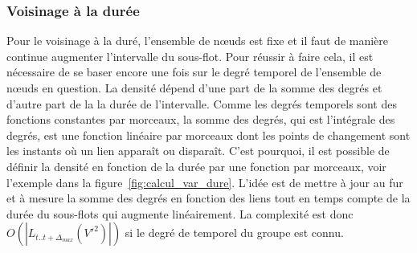 \subsubsection{Voisinage à la durée}
Pour le voisinage à la duré, l'ensemble de n\oe uds est fixe et il faut de manière continue augmenter l'intervalle du sous-flot.
Pour réussir à faire cela, il est nécessaire de se baser encore une fois sur le degré temporel de l'ensemble de n\oe uds en question.
La densité dépend d'une part de la somme des degrés et d'autre part de la la durée de l'intervalle.
Comme les degrés temporels sont des fonctions constantes par morceaux, la somme des degrés, qui est l'intégrale des degrés, est une fonction linéaire par morceaux dont les points de changement sont les instants où un lien apparaît ou disparaît.
C'est pourquoi, il est possible de définir la densité en fonction de la durée par une fonction par morceaux, voir l'exemple dans la figure~\ref{fig:calcul_var_dure}.
L'idée est de mettre à jour au fur et à mesure la somme des degrés en fonction des liens tout en temps compte de la durée du sous-flots qui augmente linéairement.
La complexité est donc $O(|L_{t..t+\Delta_{max}}(V'^2)|)$ si le degré de temporel du groupe est connu.

